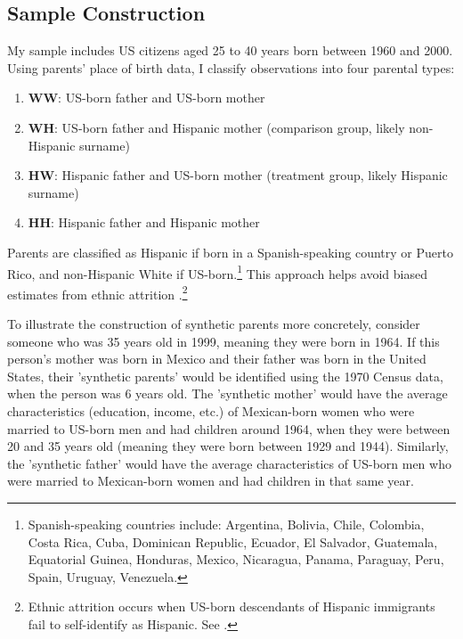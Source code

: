 \subsection{Sample Construction}

My sample includes US citizens aged 25 to 40 years born between 1960 and 2000. Using parents' place of birth data, I classify observations into four parental types:

\begin{enumerate}
\item \textbf{WW}: US-born father and US-born mother
\item \textbf{WH}: US-born father and Hispanic mother (comparison group, likely non-Hispanic surname)
\item \textbf{HW}: Hispanic father and US-born mother (treatment group, likely Hispanic surname)
\item \textbf{HH}: Hispanic father and Hispanic mother
\end{enumerate}

Parents are classified as Hispanic if born in a Spanish-speaking country or Puerto Rico, and non-Hispanic White if US-born.\footnote{Spanish-speaking countries include: Argentina, Bolivia, Chile, Colombia, Costa Rica, Cuba, Dominican Republic, Ecuador, El Salvador, Guatemala, Equatorial Guinea, Honduras, Mexico, Nicaragua, Panama, Paraguay, Peru, Spain, Uruguay, Venezuela.} This approach helps avoid biased estimates from ethnic attrition \autocite{hadah2024effect}.\footnote{Ethnic attrition occurs when US-born descendants of Hispanic immigrants fail to self-identify as Hispanic. See \textcite{antmanEthnicAttritionObserved2016,antmanEthnicAttritionAssimilation2020}.}

To illustrate the construction of synthetic parents more concretely, consider someone who was 35 years old in 1999, meaning they were born in 1964. If this person's mother was born in Mexico and their father was born in the United States, their 'synthetic parents' would be identified using the 1970 Census data, when the person was 6 years old. The 'synthetic mother' would have the average characteristics (education, income, etc.) of Mexican-born women who were married to US-born men and had children around 1964, when they were between 20 and 35 years old (meaning they were born between 1929 and 1944). Similarly, the 'synthetic father' would have the average characteristics of US-born men who were married to Mexican-born women and had children in that same year.

